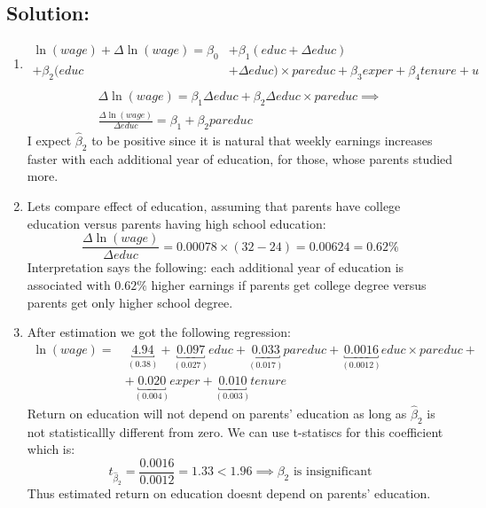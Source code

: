 \documentclass[10pt,a4paper]{amsart}
\begin{document}
\subsection*{Solution:}
\begin{enumerate}
      \item
            \begin{align*}
                  \ln (wage) + \Delta \ln (wage) = \beta_{0} & + \beta_{1} (educ + \Delta educ)               \\
                  + \beta_{2}(educ                           & + \Delta educ) \times pareduc +\beta_{3} exper
                  + \beta_{4}tenure + u                                                                       \\
            \end{align*}
            \begin{gather*}
                  \Delta \ln (wage) = \beta_{1} \Delta educ+ \beta_{2}\Delta educ \times pareduc \implies\\
                  \frac{\Delta \ln (wage)}{\Delta educ} = \beta_1 + \beta_2 pareduc
            \end{gather*}
            I expect $ \hat{\beta}_{2} $ to be positive since it is natural that weekly earnings increases
            faster with each additional year of education, for those, whose parents studied more.
      \item Lets compare effect of education, assuming that parents have college education versus
            parents having high school education:
            \[
                  \frac{\Delta \ln (wage)}{\Delta educ} = 0.00078 \times (32 - 24) = 0.00624 = 0.62\%
            \]
            Interpretation says the following: each additional year of education is associated with
            $ 0.62\% $ higher earnings if parents get college degree versus parents get only higher
            school degree.
      \item After estimation we got the following regression:
            \begin{align*}
                  \ln(wage) = & ~ \underbracket{4.94}_{(0.38)} +  \underbracket{0.097}_{(0.027)} educ + \underbracket{0.033}_{(0.017)} pareduc + \underbracket{0.0016}_{(0.0012)} educ \times pareduc + \\
                              & + \underbracket{0.020}_{(0.004)} exper + \underbracket{0.010}_{(0.003)} tenure
            \end{align*}
            Return on education will not depend on parents’ education as long as $ \hat{\beta}_2$ is not
            statisticallly different from zero. We can use t-statiscs for this coefficient which is:
            \[t_{\hat{\beta}_2} =  \frac{0.0016}{0.0012} = 1.33 < 1.96 \implies \beta_2 \text{ is insignificant}\]
            Thus estimated return on education doesnt depend on parents’ education.
\end{enumerate}
\end{document}
